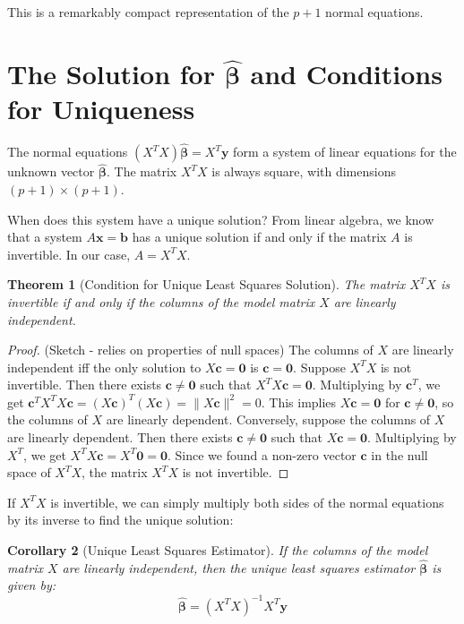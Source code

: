 \documentclass[11pt]{article}
\newtheorem{theorem}{Theorem}[section]
\newtheorem{corollary}[theorem]{Corollary}
\theoremstyle{definition}
\newcommand{\T}{^T} %
\newcommand{\norm}[1]{\|#1\|}
\begin{document}
This is a remarkably compact representation of the $p+1$ normal equations.

\section{The Solution for \(\hat{\boldsymbol{\beta}}\) and Conditions for Uniqueness}

The normal equations $(X\T X) \hat{\boldsymbol{\beta}} = X\T \mathbf{y}$ form a system of linear equations for the unknown vector $\hat{\boldsymbol{\beta}}$. The matrix $X\T X$ is always square, with dimensions $(p+1) \times (p+1)$.

When does this system have a unique solution? From linear algebra, we know that a system $A\mathbf{x} = \mathbf{b}$ has a unique solution if and only if the matrix $A$ is invertible. In our case, $A = X\T X$.

\begin{theorem}[Condition for Unique Least Squares Solution]
The matrix $X\T X$ is invertible if and only if the columns of the model matrix $X$ are linearly independent.
\end{theorem}

\begin{proof}
(Sketch - relies on properties of null spaces)
The columns of $X$ are linearly independent iff the only solution to $X\mathbf{c} = \mathbf{0}$ is $\mathbf{c} = \mathbf{0}$.
Suppose $X\T X$ is not invertible. Then there exists $\mathbf{c} \neq \mathbf{0}$ such that $X\T X \mathbf{c} = \mathbf{0}$. Multiplying by $\mathbf{c}\T$, we get $\mathbf{c}\T X\T X \mathbf{c} = (X\mathbf{c})\T (X\mathbf{c}) = \norm{X\mathbf{c}}^2 = 0$. This implies $X\mathbf{c} = \mathbf{0}$ for $\mathbf{c} \neq \mathbf{0}$, so the columns of $X$ are linearly dependent.
Conversely, suppose the columns of $X$ are linearly dependent. Then there exists $\mathbf{c} \neq \mathbf{0}$ such that $X\mathbf{c} = \mathbf{0}$. Multiplying by $X\T$, we get $X\T X \mathbf{c} = X\T \mathbf{0} = \mathbf{0}$. Since we found a non-zero vector $\mathbf{c}$ in the null space of $X\T X$, the matrix $X\T X$ is not invertible.
\end{proof}

If $X\T X$ is invertible, we can simply multiply both sides of the normal equations by its inverse to find the unique solution:

\begin{corollary}[Unique Least Squares Estimator]
If the columns of the model matrix $X$ are linearly independent, then the unique least squares estimator $\hat{\boldsymbol{\beta}}$ is given by:
\[ \hat{\boldsymbol{\beta}} = (X\T X)^{-1} X\T \mathbf{y} \]
\end{corollary}
\end{document}
